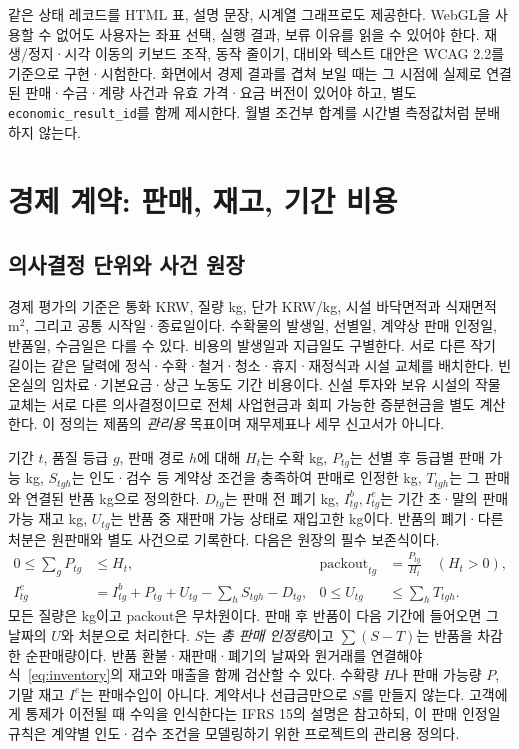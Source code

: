\documentclass[11pt,a4paper]{article}
\begin{document}
같은 상태 레코드를 HTML 표, 설명 문장, 시계열 그래프로도 제공한다. WebGL을 사용할 수 없어도 사용자는 좌표 선택, 실행 결과, 보류 이유를 읽을 수 있어야 한다. 재생/정지·시각 이동의 키보드 조작, 동작 줄이기, 대비와 텍스트 대안은 WCAG 2.2를 기준으로 구현·시험한다\cite{wcag}. 화면에서 경제 결과를 겹쳐 보일 때는 그 시점에 실제로 연결된 판매·수금·계량 사건과 유효 가격·요금 버전이 있어야 하고, 별도 \texttt{economic\_result\_id}를 함께 제시한다. 월별 조건부 합계를 시간별 측정값처럼 분배하지 않는다.

\section{경제 계약: 판매, 재고, 기간 비용}
\subsection{의사결정 단위와 사건 원장}
경제 평가의 기준은 통화 KRW, 질량 kg, 단가 KRW/kg, 시설 바닥면적과 식재면적 m$^2$, 그리고 공통 시작일·종료일이다. 수확물의 발생일, 선별일, 계약상 판매 인정일, 반품일, 수금일은 다를 수 있다. 비용의 발생일과 지급일도 구별한다. 서로 다른 작기 길이는 같은 달력에 정식·수확·철거·청소·휴지·재정식과 시설 교체를 배치한다. 빈 온실의 임차료·기본요금·상근 노동도 기간 비용이다. 신설 투자와 보유 시설의 작물 교체는 서로 다른 의사결정이므로 전체 사업현금과 회피 가능한 증분현금을 별도 계산한다. 이 정의는 제품의 \emph{관리용} 목표이며 재무제표나 세무 신고서가 아니다.

기간 $t$, 품질 등급 $g$, 판매 경로 $h$에 대해 $H_t$는 수확 kg, $P_{tg}$는 선별 후 등급별 판매 가능 kg, $S_{tgh}$는 인도·검수 등 계약상 조건을 충족하여 판매로 인정한 kg, $T_{tgh}$는 그 판매와 연결된 반품 kg으로 정의한다. $D_{tg}$는 판매 전 폐기 kg, $I_{tg}^{b},I_{tg}^{e}$는 기간 초·말의 판매 가능 재고 kg, $U_{tg}$는 반품 중 재판매 가능 상태로 재입고한 kg이다. 반품의 폐기·다른 처분은 원판매와 별도 사건으로 기록한다. 다음은 원장의 필수 보존식이다.
\begin{align}
0\leq\sum_g P_{tg}&\leq H_t,
&\operatorname{packout}_{tg}&=\frac{P_{tg}}{H_t}\quad (H_t>0),\label{eq:packout}\\
I^e_{tg}&=I^b_{tg}+P_{tg}+U_{tg}-\sum_h S_{tgh}-D_{tg},
&0\leq U_{tg}&\leq\sum_h T_{tgh}.\label{eq:inventory}
\end{align}
모든 질량은 kg이고 packout은 무차원이다. 판매 후 반품이 다음 기간에 들어오면 그 날짜의 $U$와 처분으로 처리한다. $S$는 \emph{총 판매 인정량}이고 $\sum(S-T)$는 반품을 차감한 순판매량이다. 반품 환불·재판매·폐기의 날짜와 원거래를 연결해야 식~\eqref{eq:inventory}의 재고와 매출을 함께 검산할 수 있다. 수확량 $H$나 판매 가능량 $P$, 기말 재고 $I^e$는 판매수입이 아니다. 계약서나 선급금만으로 $S$를 만들지 않는다. 고객에게 통제가 이전될 때 수익을 인식한다는 IFRS 15의 설명은 참고하되, 이 판매 인정일 규칙은 계약별 인도·검수 조건을 모델링하기 위한 프로젝트의 관리용 정의다\cite{ifrs15}.
\end{document}
